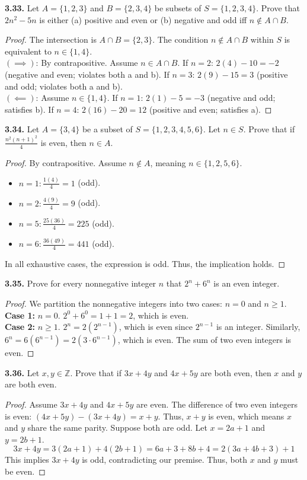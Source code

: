\documentclass[11pt]{article}
\begin{document}
\textbf{3.33.} Let $A = \{1, 2, 3\}$ and $B = \{2, 3, 4\}$ be subsets of $S = \{1, 2, 3, 4\}$. Prove that $2n^2 - 5n$ is either (a) positive and even or (b) negative and odd iff $n \notin A \cap B$.
\begin{proof}
The intersection is $A \cap B = \{2, 3\}$. The condition $n \notin A \cap B$ within $S$ is equivalent to $n \in \{1, 4\}$. \\
$(\implies)$: By contrapositive. Assume $n \in A \cap B$. 
If $n = 2$: $2(4) - 10 = -2$ (negative and even; violates both a and b).
If $n = 3$: $2(9) - 15 = 3$ (positive and odd; violates both a and b). \\
$(\impliedby)$: Assume $n \in \{1, 4\}$.
If $n = 1$: $2(1) - 5 = -3$ (negative and odd; satisfies b).
If $n = 4$: $2(16) - 20 = 12$ (positive and even; satisfies a).
\end{proof}

\textbf{3.34.} Let $A = \{3, 4\}$ be a subset of $S = \{1, 2, 3, 4, 5, 6\}$. Let $n \in S$. Prove that if $\frac{n^2(n + 1)^2}{4}$ is even, then $n \in A$.
\begin{proof}
By contrapositive. Assume $n \notin A$, meaning $n \in \{1, 2, 5, 6\}$. 
\begin{itemize}
    \item $n=1: \frac{1(4)}{4} = 1$ (odd).
    \item $n=2: \frac{4(9)}{4} = 9$ (odd).
    \item $n=5: \frac{25(36)}{4} = 225$ (odd).
    \item $n=6: \frac{36(49)}{4} = 441$ (odd).
\end{itemize}
In all exhaustive cases, the expression is odd. Thus, the implication holds.
\end{proof}

\textbf{3.35.} Prove for every nonnegative integer $n$ that $2^n + 6^n$ is an even integer.
\begin{proof}
We partition the nonnegative integers into two cases: $n = 0$ and $n \ge 1$. \\
\textbf{Case 1:} $n = 0$. $2^0 + 6^0 = 1 + 1 = 2$, which is even. \\
\textbf{Case 2:} $n \ge 1$. $2^n = 2(2^{n-1})$, which is even since $2^{n-1}$ is an integer. Similarly, $6^n = 6(6^{n-1}) = 2(3 \cdot 6^{n-1})$, which is even. The sum of two even integers is even.
\end{proof}

\textbf{3.36.} Let $x, y \in \mathbb{Z}$. Prove that if $3x + 4y$ and $4x + 5y$ are both even, then $x$ and $y$ are both even.
\begin{proof}
Assume $3x + 4y$ and $4x + 5y$ are even. The difference of two even integers is even: $(4x + 5y) - (3x + 4y) = x + y$. Thus, $x + y$ is even, which means $x$ and $y$ share the same parity. 
Suppose both are odd. Let $x = 2a + 1$ and $y = 2b + 1$. 
\[ 3x + 4y = 3(2a + 1) + 4(2b + 1) = 6a + 3 + 8b + 4 = 2(3a + 4b + 3) + 1 \]
This implies $3x + 4y$ is odd, contradicting our premise. Thus, both $x$ and $y$ must be even.
\end{proof}
\end{document}
